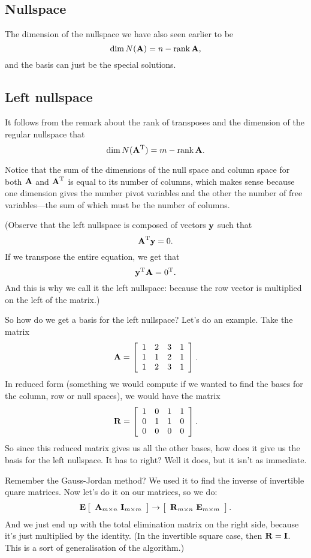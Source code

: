\subsection{Nullspace}
The dimension of the nullspace we have also seen earlier to be
\[ \mathrm{dim}\,  N(\boldsymbol{\mathbf{A}}) = n - \mathrm{rank}\, \boldsymbol{\mathbf{A}}, \]
and the basis can just be the special solutions. 

\subsection{Left nullspace}
It follows from the remark about the rank of transposes and the dimension of the regular nullspace that
\[ \mathrm{dim}\,  N(\boldsymbol{\mathbf{A}}^\mathrm{T}) = m - \mathrm{rank}\, \boldsymbol{\mathbf{A}}. \]

\brm
Notice that the sum of the dimensions of the null space and column space for both $\boldsymbol{\mathbf{A}}$ and $\boldsymbol{\mathbf{A}}^\mathrm{T}$ is equal to its number of columns, which makes sense because one dimension gives the number pivot variables and the other the number of free variables---the sum of which must be the number of columns.
\erm

(Observe that the left nullspace is composed of vectors $\boldsymbol{\mathbf{y}}$ such that
\[ \boldsymbol{\mathbf{A}}^\mathrm{T} \boldsymbol{\mathbf{y}} = 0. \]
If we transpose the entire equation, we get that
\[ \boldsymbol{\mathbf{y}}^\mathrm{T} \boldsymbol{\mathbf{A}} = 0^\mathrm{T}. \]
And this is why we call it the left nullspace: because the row vector is multiplied on the left of the matrix.)

So how do we get a basis for the left nullspace? Let's do an example.
\bex
Take the matrix  
\[ \boldsymbol{\mathbf{A}} = \left[ \begin{array}{rrrrrrrrrrrrrrrrrrrrrrrrr} 1&2&3&1\\1&1&2&1\\1&2&3&1\\ \end{array} \right]. \]
In reduced form (something we would compute if we wanted to find the bases for the column, row or null spaces), we would have the matrix
\[ \boldsymbol{\mathbf{R}} = \left[ \begin{array}{rrrrrrrrrrrrrrrrrrrrrrrrr} 1&0&1&1\\0&1&1&0\\0&0&0&0\\ \end{array} \right]. \]
So since this reduced matrix gives us all the other bases, how does it give us the basis for the left nullspace. It has to right? Well it does, but it isn't as immediate.

Remember the Gauss-Jordan method? We used it to find the inverse of invertible quare matrices. Now let's do it on our matrices, so we do:
\[ \boldsymbol{\mathbf{E}} \left[ \begin{array}{rrrrrrrrrrrrrrrrrrrrrrrrr} \boldsymbol{\mathbf{A}}_{m \times n}\ \boldsymbol{\mathbf{I}}_{m \times m}\\ \end{array} \right] \rightarrow \left[ \begin{array}{rrrrrrrrrrrrrrrrrrrrrrrrr} \boldsymbol{\mathbf{R}}_{m \times n}\ \boldsymbol{\mathbf{E}}_{m \times m}\\ \end{array} \right]. \]
And we just end up with the total elimination matrix on the right side, because it's just multiplied by the identity. (In the invertible square case, then $\boldsymbol{\mathbf{R}} = \boldsymbol{\mathbf{I}}$. This is a sort of generalisation of the algorithm.) 

